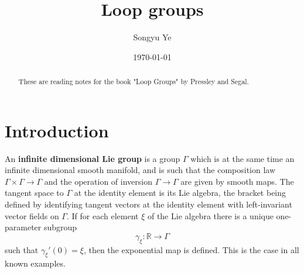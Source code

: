 \documentclass[12pt]{article}
\begin{document}
\rhead{\today}
\cfoot{\thepage}

\title{Loop groups}

\author{Songyu Ye}
\date{\today}
\maketitle


\begin{abstract}
    These are reading notes for the book "Loop Groups" by Pressley and Segal.
\end{abstract}

\tableofcontents

\section{Introduction}
\begin{definition}
    An \textbf{infinite dimensional Lie group} is a group $\Gamma$ which is at the
    same time an infinite dimensional smooth manifold, and is such that
    the composition law $\Gamma \times \Gamma \to \Gamma$ and the
    operation of inversion $\Gamma \to \Gamma$ are given by smooth maps.
    The tangent space to $\Gamma$ at the identity element is its Lie
    algebra, the bracket being defined by identifying tangent vectors at
    the identity element with left-invariant vector fields on $\Gamma$.
    If for each element $\xi$ of the Lie algebra there is a unique
    one-parameter subgroup
    \[
        \gamma_\xi : \mathbb{R} \to \Gamma
    \]
    such that $\gamma_\xi'(0) = \xi$, then the exponential map is defined.
    This is the case in all known examples.
\end{definition}
\end{document}
